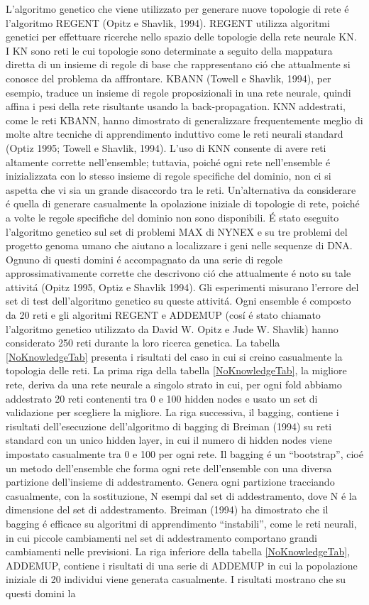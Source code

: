 \documentclass[a4paper,10pt]{article}
\begin{document}
  L'algoritmo genetico che viene utilizzato per generare nuove topologie di rete \'e l'algoritmo REGENT (Opitz e Shavlik, 1994). REGENT utilizza algoritmi genetici per effettuare ricerche nello spazio delle topologie della rete neurale KN. I KN sono reti le cui topologie sono determinate a seguito della mappatura diretta di un insieme di regole di base che rappresentano ci\'o che attualmente si conosce del problema da afffrontare. KBANN (Towell e Shavlik, 1994), per esempio, traduce un insieme di regole proposizionali in una rete neurale, quindi affina i pesi della rete risultante usando la back-propagation. KNN addestrati, come le reti KBANN, hanno dimostrato di generalizzare frequentemente meglio di molte altre tecniche di apprendimento induttivo come le reti neurali standard (Optiz 1995; Towell e Shavlik, 1994). L'uso di KNN consente di avere reti altamente corrette nell'ensemble; tuttavia, poich\'e ogni rete nell'ensemble \'e inizializzata con lo stesso insieme di regole specifiche del dominio, non ci si aspetta che vi sia un grande disaccordo tra le reti. Un'alternativa da considerare \'e quella di generare casualmente la opolazione iniziale di topologie di rete, poich\'e a volte le regole specifiche del dominio non sono disponibili. \'E stato eseguito l'algoritmo genetico sul set di problemi MAX di NYNEX e su tre problemi del progetto genoma umano che aiutano a localizzare i geni nelle sequenze di DNA. Ognuno di questi domini \'e accompagnato da una serie di regole approssimativamente corrette che descrivono ci\'o che attualmente \'e noto su tale attivit\'a (Opitz 1995, Optiz e Shavlik 1994). Gli esperimenti misurano l'errore del set di test dell'algoritmo genetico su queste attivit\'a. Ogni ensemble \'e composto da 20 reti e gli algoritmi REGENT e ADDEMUP (cos\'i \'e stato chiamato l'algoritmo genetico utilizzato da David W. Opitz e Jude W. Shavlik) hanno considerato 250 reti durante la loro ricerca genetica. La tabella \ref{NoKnowledgeTab} presenta i risultati del caso in cui si creino casualmente la topologia delle reti. La prima riga della tabella \ref{NoKnowledgeTab}, la migliore rete, deriva da una rete neurale a singolo strato in cui, per ogni fold abbiamo addestrato 20 reti contenenti tra 0 e 100 hidden nodes e usato un set di validazione per scegliere la migliore. La riga successiva, il bagging, contiene i risultati dell'esecuzione dell'algoritmo di bagging di Breiman (1994) su reti standard con un unico hidden layer, in cui il numero di hidden nodes viene impostato casualmente tra 0 e 100 per ogni rete. Il bagging \'e un ``bootstrap'', cio\'e un metodo dell'ensemble che forma ogni rete dell'ensemble con una diversa partizione dell'insieme di addestramento. Genera ogni partizione tracciando casualmente, con la sostituzione, N esempi dal set di addestramento, dove N \'e la dimensione del set di addestramento. Breiman (1994) ha dimostrato che il bagging \'e efficace su algoritmi di apprendimento ``instabili'', come le reti neurali, in cui piccole cambiamenti nel set di addestramento comportano grandi cambiamenti nelle previsioni. La riga inferiore della tabella \ref{NoKnowledgeTab}, ADDEMUP, contiene i risultati di una serie di ADDEMUP in cui la popolazione iniziale di 20 individui viene generata casualmente. I risultati mostrano che su questi domini la 
\end{document}
